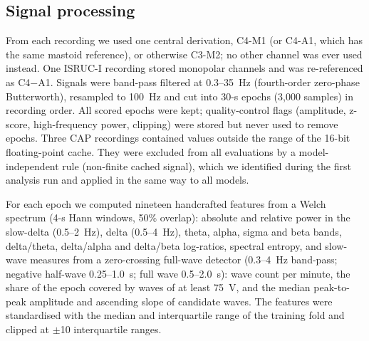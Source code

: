 \subsection{Signal processing}
\label{sec:exclusions}
From each recording we used one central derivation, C4-M1 (or C4-A1, which has the same mastoid reference), or otherwise C3-M2; no other channel was ever used instead. One ISRUC-I recording stored monopolar channels and was re-referenced as C4$-$A1. Signals were band-pass filtered at 0.3--35~Hz (fourth-order zero-phase Butterworth), resampled to 100~Hz and cut into 30-s epochs (3,000 samples) in recording order. All scored epochs were kept; quality-control flags (amplitude, z-score, high-frequency power, clipping) were stored but never used to remove epochs. Three CAP recordings contained values outside the range of the 16-bit floating-point cache. They were excluded from all evaluations by a model-independent rule (non-finite cached signal), which we identified during the first analysis run and applied in the same way to all models. %

For each epoch we computed nineteen handcrafted features from a Welch spectrum (4-s Hann windows, 50\% overlap): absolute and relative power in the slow-delta (0.5--2~Hz), delta (0.5--4~Hz), theta, alpha, sigma and beta bands, delta/theta, delta/alpha and delta/beta log-ratios, spectral entropy, and slow-wave measures from a zero-crossing full-wave detector \cite{massimini2004travelling} (0.3--4~Hz band-pass; negative half-wave 0.25--1.0~s; full wave 0.5--2.0~s): wave count per minute, the share of the epoch covered by waves of at least 75~\textmu V, and the median peak-to-peak amplitude and ascending slope of candidate waves. The features were standardised with the median and interquartile range of the training fold and clipped at $\pm$10 interquartile ranges.


